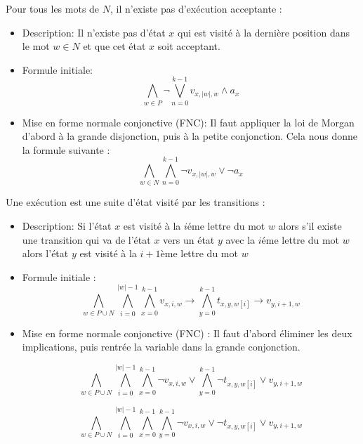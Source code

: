 \begin{tcolorbox}[defaultstyle,title=Contrainte 3]
    Pour tous les mots de $N$, il n'existe pas d'exécution acceptante :
    
    \begin{itemize}
        \item Description: Il n'existe pas d'état \(x\) qui est visité à la dernière position dans le mot \( w \in N \) et que cet état \(x\) soit acceptant.\\
    
        \item Formule initiale:
        \[ \bigwedge\limits_{w \in P}\neg \bigvee\limits_{n=0}^{k-1} v_{x, |w|, w} \land a_{x} \]
        
        \item Mise en forme normale conjonctive (FNC): Il faut appliquer la loi de Morgan d'abord à la grande disjonction, puis à la petite conjonction.  Cela nous donne la formule suivante :
        \[ \bigwedge\limits_{w \in N}\bigwedge\limits_{n=0}^{k-1} \lnot v_{x, |w|, w} \lor \lnot a_{x} \]
    \end{itemize}
\end{tcolorbox}

\begin{tcolorbox}[defaultstyle,title=Contrainte 4]
    Une exécution est une suite d'état visité par les transitions :
        
    \begin{itemize}
    \item Description: Si l'état $x$ est visité à la $i$éme lettre du mot $w$ alors s'il existe une transition qui va de l'état $x$ vers un état $y$ avec la $i$éme lettre du mot $w$ alors l'état $y$ est visité à la $i+1$ème lettre du mot $w$ \\
    
    \item Formule initiale :
        \[\bigwedge\limits_{w\in P \cup N} \bigwedge\limits_{i=0}^{|w|-1}\bigwedge\limits_{x=0}^{k-1} v_{x,i,w} \rightarrow \bigwedge\limits_{y=0}^{k-1} t_{x,y,w[i]} \rightarrow v_{y,i+1,w} \]

    \item Mise en forme normale conjonctive (FNC) : Il faut d'abord éliminer les deux implications, puis rentrée la variable dans la grande conjonction.
    
    \[ \bigwedge\limits_{w\in P \cup N} \bigwedge\limits_{i=0}^{|w|-1}\bigwedge\limits_{x=0}^{k-1} \lnot v_{x,i,w} \lor \bigwedge\limits_{y=0}^{k-1} \lnot t_{x,y,w[i]} \lor v_{y,i+1,w} \]
    
    \[ \bigwedge\limits_{w\in P \cup N} \bigwedge\limits_{i=0}^{|w|-1}\bigwedge\limits_{x=0}^{k-1} \bigwedge\limits_{y=0}^{k-1} \lnot v_{x,i,w} \lor \lnot t_{x,y,w[i]} \lor v_{y,i+1,w} \]
    
    \end{itemize}

\end{tcolorbox}

